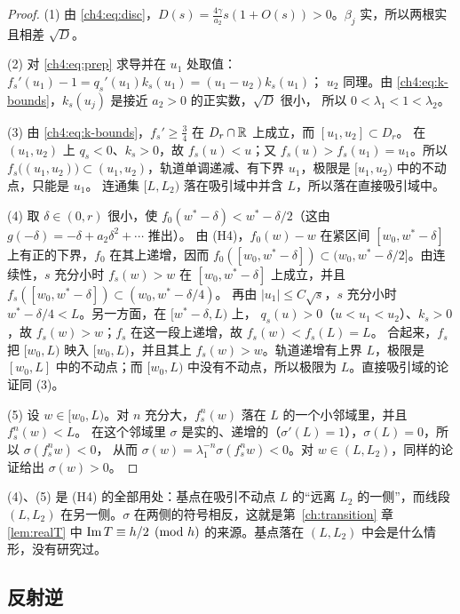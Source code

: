 \begin{proof}
(1) 由 \eqref{ch4:eq:disc}，$D(s)=\frac{4\gamma}{a_2}s(1+O(s))>0$。$\beta_j$ 实，所以两根实且相差 $\sqrt D$。

(2) 对 \eqref{ch4:eq:prep} 求导并在 $u_1$ 处取值：$f_s'(u_1)-1=q_s'(u_1)k_s(u_1)=(u_1-u_2)k_s(u_1)$；
$u_2$ 同理。由 \eqref{ch4:eq:k-bounds}，$k_s(u_j)$ 是接近 $a_2>0$ 的正实数，$\sqrt D$ 很小，
所以 $0<\lambda_1<1<\lambda_2$。

(3) 由 \eqref{ch4:eq:k-bounds}，$f_s'\ge\frac34$ 在 $D_r\cap\mathbb{R}$ 上成立，而 $[u_1,u_2]\subset D_r$。
在 $(u_1,u_2)$ 上 $q_s<0$、$k_s>0$，故 $f_s(u)<u$；又 $f_s(u)>f_s(u_1)=u_1$。所以
$f_s\bigl((u_1,u_2)\bigr)\subset(u_1,u_2)$，轨道单调递减、有下界 $u_1$，极限是 $[u_1,u_2)$ 中的不动点，只能是 $u_1$。
连通集 $[L,L_2)$ 落在吸引域中并含 $L$，所以落在直接吸引域中。

(4) 取 $\delta\in(0,r)$ 很小，使 $f_0(w^*-\delta)<w^*-\delta/2$（这由 $g(-\delta)=-\delta+a_2\delta^2+\cdots$ 推出）。
由 (H4)，$f_0(w)-w$ 在紧区间 $[w_0,w^*-\delta]$ 上有正的下界，$f_0$ 在其上递增，因而
$f_0([w_0,w^*-\delta])\subset(w_0,w^*-\delta/2]$。由连续性，$s$ 充分小时
$f_s(w)>w$ 在 $[w_0,w^*-\delta]$ 上成立，并且 $f_s([w_0,w^*-\delta])\subset(w_0,w^*-\delta/4)$。
再由 $|u_1|\le C\sqrt s$，$s$ 充分小时 $w^*-\delta/4<L$。另一方面，在 $[w^*-\delta,L)$ 上，
$q_s(u)>0$（$u<u_1<u_2$）、$k_s>0$，故 $f_s(w)>w$；$f_s$ 在这一段上递增，故 $f_s(w)<f_s(L)=L$。
合起来，$f_s$ 把 $[w_0,L)$ 映入 $[w_0,L)$，并且其上 $f_s(w)>w$。轨道递增有上界 $L$，极限是
$[w_0,L]$ 中的不动点；而 $[w_0,L)$ 中没有不动点，所以极限为 $L$。直接吸引域的论证同 (3)。

(5) 设 $w\in[w_0,L)$。对 $n$ 充分大，$f_s^n(w)$ 落在 $L$ 的一个小邻域里，并且 $f_s^n(w)<L$。
在这个邻域里 $\sigma$ 是实的、递增的（$\sigma'(L)=1$），$\sigma(L)=0$，所以 $\sigma(f_s^nw)<0$，
从而 $\sigma(w)=\lambda_1^{-n}\sigma(f_s^nw)<0$。对 $w\in(L,L_2)$，同样的论证给出 $\sigma(w)>0$。
\end{proof}

\begin{remark}\label{ch4:rem:far-side}
(4)、(5) 是 (H4) 的全部用处：基点在吸引不动点 $L$ 的``远离 $L_2$ 的一侧''，而线段 $(L,L_2)$
在另一侧。$\sigma$ 在两侧的符号相反，这就是第~\ref{ch:transition} 章 \cref{lem:realT} 中
$\operatorname{Im} T\equiv h/2\pmod h$ 的来源。基点落在 $(L,L_2)$ 中会是什么情形，没有研究过。
\end{remark}

\subsection{反射逆}

